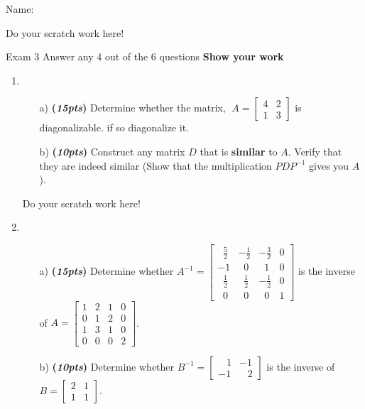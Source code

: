 \documentclass[12pt]{article}%
\begin{document}
Name:\hrulefill

\newpage
 Do your scratch work here!
 
\newpage
     

Exam 3 \hfill Answer any 4 out of the 6 questions \hfill \textbf{Show your work}
\\
\HRule


\begin{enumerate} 
    \item 
    \begin{itemize}
        \item[a)]\textbf{(\emph{15pts})} Determine whether the matrix, 
        \(\;A = \begin{bmatrix} 4 & 2 \\ 1 & 3 \end{bmatrix}\) is diagonalizable. if so diagonalize it.
    
    \vspace{10cm}
    
    \item[b)]\textbf{(\emph{10pts})} Construct any matrix \(D\) that is \textbf{similar} to \(A\).
    Verify that they are indeed similar (Show that the multiplication \(PDP^{-1}\) gives you \(A\)).
    \end{itemize}

    \newpage
     Do your scratch work here!
     
    \newpage
    
    \item 
    \begin{itemize}
        \item[a)]\textbf{(\emph{15pts})} Determine whether \(A^{-1} = \begin{bmatrix} \;\;\frac{5}{2} & -\frac{1}{2} & -\frac{3}{2} & 0 \\ -1 & \;\;0 & \;\;1 & 0 \\ \;\;\frac{1}{2} & \;\;\frac{1}{2} & -\frac{1}{2} & 0\\ \;\;0 & \;\;0 & \;\;0 & 1 \end{bmatrix}\) is the inverse of  \(A = \begin{bmatrix} 1 & 2 & 1 & 0\\ 0 & 1 & 2 & 0\\ 1 & 3 & 1 & 0\\ 0 & 0 & 0 & 2 \end{bmatrix}\).

        \vspace{12.5cm}

        \item[b)]\textbf{(\emph{10pts})} Determine whether \(B^{-1} = \begin{bmatrix} \;\;\;1 & -1 \\ -1 & \;\;\;2 \end{bmatrix}\) is the inverse of  \(B = \begin{bmatrix} 2 & 1 \\ 1 & 1 \end{bmatrix}\).
    \end{itemize}


\end{enumerate}
\end{document}
